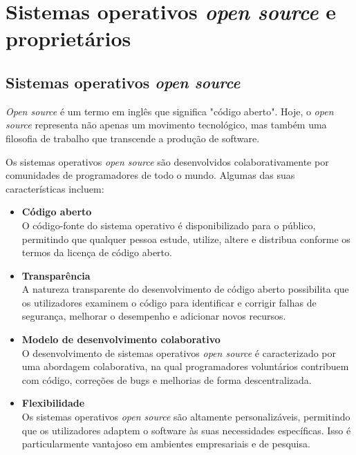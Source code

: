 \section{Sistemas operativos \textit{open source} e proprietários} \label{section: sistemas operativos}

\subsection{Sistemas operativos \textit{open source} }
\textit{Open source} é um termo em inglês que significa "código aberto". Hoje, o \textit{open source} representa não apenas um movimento tecnológico, mas também uma filosofia de trabalho que transcende a produção de software. \cite{whatIsOpenSource}
\par \vspace{6pt}
Os sistemas operativos \textit{open source} são desenvolvidos colaborativamente por comunidades de programadores de todo o mundo. Algumas das suas características incluem: \cite{advantagesOfOpenSource}

\begin{itemize}

  \item \textbf{Código aberto}\\
  O código-fonte do sistema operativo é disponibilizado para o público, permitindo que qualquer pessoa estude, utilize, altere e distribua conforme os termos da licença de código aberto.

  \item \textbf{Transparência}\\
  A natureza transparente do desenvolvimento de código aberto possibilita que os utilizadores examinem o código para identificar e corrigir falhas de segurança, melhorar o desempenho e adicionar novos recursos.

  \item \textbf{Modelo de desenvolvimento colaborativo}\\
  O desenvolvimento de sistemas operativos \textit{open source} é caracterizado por uma abordagem colaborativa, na qual programadores voluntários contribuem com código, correções de bugs e melhorias de forma descentralizada.

  \item \textbf{Flexibilidade}\\
  Os sistemas operativos \textit{open source} são altamente personalizáveis, permitindo que os utilizadores adaptem o software às suas necessidades específicas. Isso é particularmente vantajoso em ambientes empresariais e de pesquisa.
\end{itemize}

